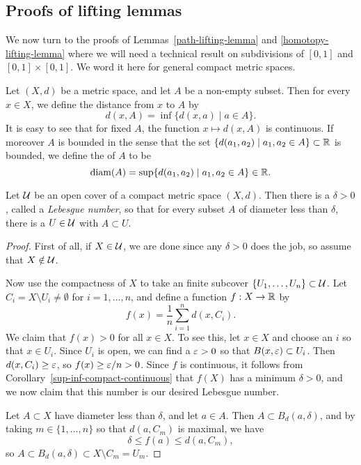 \subsection{Proofs of lifting lemmas}
\label{proofs-lifting-lemmas}
We now turn to the proofs of Lemmas~\ref{path-lifting-lemma} and \ref{homotopy-lifting-lemma} where we will need a technical result on subdivisions of $[0,1]$ and $[0,1] \times [0,1]$. We word it here for general compact metric spaces.

Let $(X,d)$ be a metric space, and let $A$ be a non-empty subset. Then for every $x \in X$, we define the distance from $x$ to $A$ by
\[
  d(x,A) = \inf \{ d(x,a) \mid a \in A \}.
\]
It is easy to see that for fixed $A$, the function $x \mapsto d(x,A)$ is continuous. If moreover $A$ is bounded in the sense that the set $\{d(a_1,a_2) \mid a_1,a_2 \in A\} \subset \mathbb{R}$ is bounded, we define the  of $A$ to be
\[
  \operatorname{diam}(A) = \sup \{d(a_1,a_2) \mid a_1,a_2 \in A \} \in \mathbb{R}.
\]
\begin{lem}
  \label{lebesgue-number-lemma}
  Let $\mathcal{U}$ be an open cover of a compact metric space $(X,d)$. Then there is a $\delta > 0$, called a \emph{Lebesgue number}, so that for every subset $A$ of diameter less than $\delta$, there is a $U \in \mathcal{U}$ with $A \subset U$.
\end{lem}
\begin{proof}
  First of all, if $X \in \mathcal{U}$, we are done since any $\delta > 0$ does the job, so assume that $X \notin \mathcal{U}$.

  Now use the compactness of $X$ to take an finite subcover $\{U_1,\dots,U_n\} \subset \mathcal{U}$. Let $C_i = X \setminus U_i \not= \emptyset$ for $i = 1, \dots, n$, and define a function $f : X \to \mathbb{R}$ by
  \[
    f(x) = \frac{1}{n} \sum_{i=1}^n d(x,C_i).
  \]
  We claim that $f(x) > 0$ for all $x \in X$. To see this, let $x \in X$ and choose an $i$ so that $x \in U_i$. Since $U_i$ is open, we can find a $\varepsilon > 0$ so that $B(x,\varepsilon) \subset U_i$. Then $d(x,C_i) \geq \varepsilon$, so $f(x) \geq \varepsilon/n > 0$. Since $f$ is continuous, it follows from Corollary~\ref{sup-inf-compact-continuous} that $f(X)$ has a minimum $\delta > 0$, and we now claim that this number is our desired Lebesgue number.
  
  Let $A \subset X$ have diameter less than $\delta$, and let $a \in A$. Then $A \subset B_d(a,\delta)$, and by taking $m \in \{1,\dots,n\}$ so that $d(a,C_m)$ is maximal, we have
  \[
    \delta \leq f(a) \leq d(a,C_m),
  \]
  so $A \subset B_d(a,\delta) \subset X \setminus C_m = U_m$.
\end{proof}
